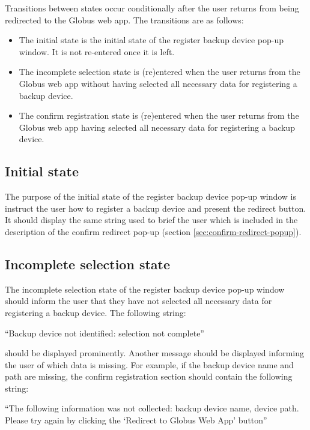 Transitions between states occur conditionally after the user returns from being redirected 
to the Globus web app. The transitions are as follows:

\begin{itemize}
    \item The initial state is the initial state of the register backup device pop-up window. It
    is not re-entered once it is left.
    \item The incomplete selection state is (re)entered when the user returns from the Globus web app
    without having selected all necessary data for registering a backup device.
    \item The confirm registration state is (re)entered when the user returns from the Globus web app
    having selected all necessary data for registering a backup device.
\end{itemize}

\subsection{Initial state}

The purpose of the initial state of the register backup device pop-up window is instruct the user
how to register a backup device and present the redirect button. It should display the same 
string used to brief the user which is included in the description of the confirm redirect pop-up (section 
\ref{sec:confirm-redirect-popup}).

\subsection{Incomplete selection state}

The incomplete selection state of the register backup device pop-up window should inform 
the user that they have not selected all necessary data for registering a backup device.
The following string:

\vspace{3mm}
``Backup device not identified: selection not complete''
\vspace{3mm}

\noindent should be displayed prominently.
Another message should be displayed informing the user of which data is missing. For example, 
if the backup device name and path are missing, the confirm registration section should contain the 
following string:

\vspace{3mm}
``The following information was not collected: backup device name, device path. Please try 
again by clicking the `Redirect to Globus Web App' button''
\vspace{3mm}

